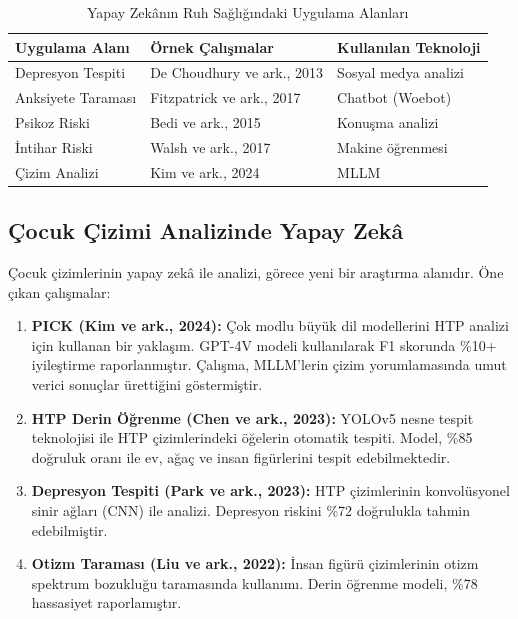\begin{table}[H]
\centering
\caption{Yapay Zekânın Ruh Sağlığındaki Uygulama Alanları}
\label{tab:airuhsagligi}
\begin{tabular}{p{3.5cm}p{5cm}p{4cm}}
\toprule
\textbf{Uygulama Alanı} & \textbf{Örnek Çalışmalar} & \textbf{Kullanılan Teknoloji} \\
\midrule
Depresyon Tespiti & De Choudhury ve ark., 2013 & Sosyal medya analizi \\
Anksiyete Taraması & Fitzpatrick ve ark., 2017 & Chatbot (Woebot) \\
Psikoz Riski & Bedi ve ark., 2015 & Konuşma analizi \\
İntihar Riski & Walsh ve ark., 2017 & Makine öğrenmesi \\
Çizim Analizi & Kim ve ark., 2024 & MLLM \\
\bottomrule
\end{tabular}
\end{table}

\subsection{Çocuk Çizimi Analizinde Yapay Zekâ}

Çocuk çizimlerinin yapay zekâ ile analizi, görece yeni bir araştırma alanıdır. Öne çıkan çalışmalar:

\begin{enumerate}
  \item \textbf{PICK (Kim ve ark., 2024):} Çok modlu büyük dil modellerini HTP analizi için kullanan bir yaklaşım. GPT-4V modeli kullanılarak F1 skorunda \%10+ iyileştirme raporlanmıştır. Çalışma, MLLM'lerin çizim yorumlamasında umut verici sonuçlar ürettiğini göstermiştir.

  \item \textbf{HTP Derin Öğrenme (Chen ve ark., 2023):} YOLOv5 nesne tespit teknolojisi ile HTP çizimlerindeki öğelerin otomatik tespiti. Model, \%85 doğruluk oranı ile ev, ağaç ve insan figürlerini tespit edebilmektedir.

  \item \textbf{Depresyon Tespiti (Park ve ark., 2023):} HTP çizimlerinin konvolüsyonel sinir ağları (CNN) ile analizi. Depresyon riskini \%72 doğrulukla tahmin edebilmiştir.

  \item \textbf{Otizm Taraması (Liu ve ark., 2022):} İnsan figürü çizimlerinin otizm spektrum bozukluğu taramasında kullanımı. Derin öğrenme modeli, \%78 hassasiyet raporlamıştır.
\end{enumerate}

